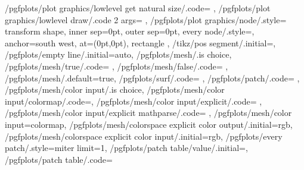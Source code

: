 {	/pgfplots/plot graphics/lowlevel get natural size/.code={%
		\pgfplots@plot@handler@graphics@getnaturalsize
	},
	/pgfplots/plot graphics/lowlevel draw/.code 2 args={%
	},%
	/pgfplots/plot graphics/node/.style={
		transform shape,
		inner sep=0pt,
		outer sep=0pt,
		every node/.style={},
		anchor=south west,
		at={(0pt,0pt)},
		rectangle
	},
	/tikz/pos segment/.initial=,
	/pgfplots/empty line/.initial=auto,
	/pgfplots/mesh/.is choice,
	/pgfplots/mesh/true/.code={%
		\def\pgfplots@meshmode{m}%
		\let\tikz@plot@handler=\pgfplotsplothandlermesh
	},
	/pgfplots/mesh/false/.code={
		\def\pgfplots@meshmode{n}%
		\ifx\tikz@plot@handler\pgfplotsplothandlermesh
			\let\tikz@plot@handler=\pgfplothandlerlineto
		\fi},
	/pgfplots/mesh/.default=true,
	/pgfplots/surf/.code={%
		\def\pgfplots@meshmode{s}%
	},%
	/pgfplots/patch/.code={%
	},%
	/pgfplots/mesh/color input/.is choice,
	/pgfplots/mesh/color input/colormap/.code=\def\pgfplotsplothandlermesh@colorinput{0},%
	/pgfplots/mesh/color input/explicit/.code={%
		\def\pgfplotsplothandlermesh@colorinput{1}%
		\def\pgfplotsplothandlermesh@colorinput@mathparse{0}%
	},%
	/pgfplots/mesh/color input/explicit mathparse/.code={%
		\def\pgfplotsplothandlermesh@colorinput@mathparse{1}%
	},%
	/pgfplots/mesh/color input=colormap,
	/pgfplots/mesh/colorspace explicit color output/.initial=rgb,
	/pgfplots/mesh/colorspace explicit color input/.initial=rgb,
	/pgfplots/every patch/.style={miter limit=1},
	/pgfplots/patch table/value/.initial=,
	/pgfplots/patch table/.code={
}}
